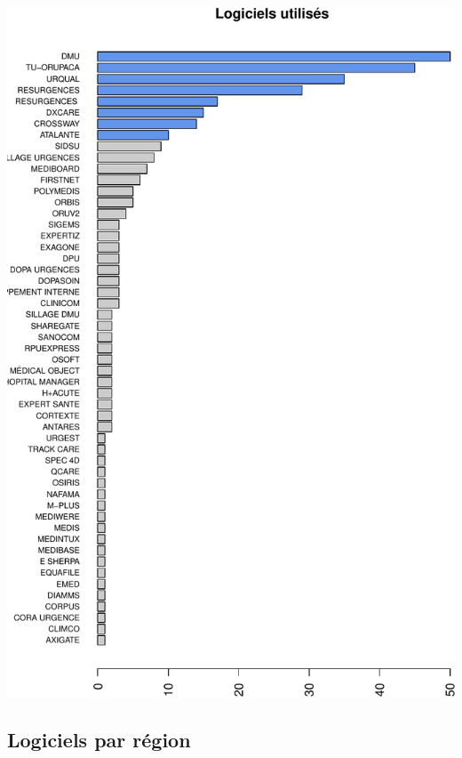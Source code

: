 \documentclass[]{article}
\begin{document}
\includegraphics{septembre2015_files/figure-latex/unnamed-chunk-7-1.pdf}

\subsection{Logiciels par région}\label{logiciels-par-region}
\end{document}

